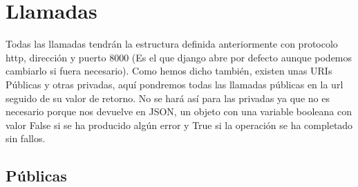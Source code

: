 \chapter{Llamadas}

Todas las llamadas tendrán la estructura definida anteriormente con protocolo http, dirección  y puerto 8000 (Es el que django abre por defecto aunque podemos cambiarlo si fuera necesario).
Como hemos dicho también, existen unas URIs Públicas y otras privadas, aquí pondremos todas las llamadas públicas en la url seguido de su valor de retorno. No se hará así para las privadas ya que no es necesario porque nos devuelve en JSON, un objeto con una variable booleana con valor False si se ha producido algún error y True si la operación se ha completado sin fallos.
\section{Públicas}
